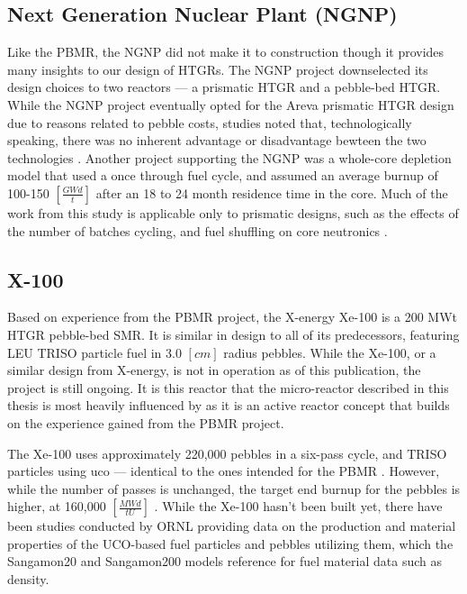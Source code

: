 \subsection{Next Generation Nuclear Plant (NGNP)}

Like the PBMR, the NGNP did not make it to construction though it provides many insights to our design of HTGRs.  The NGNP project downselected its design choices to two reactors --- a prismatic HTGR and a pebble-bed HTGR.  While the NGNP project eventually opted for the Areva prismatic HTGR design \cite{noauthor_areva_nodate} due to reasons related to pebble costs, studies noted that, technologically speaking, there was no inherent advantage or disadvantage bewteen the two technologies \cite{inl_basis_2011}.  Another project supporting the NGNP was a whole-core depletion model that used a once through fuel cycle, and assumed an average burnup of 100-150 $\left[\frac{GWd}{t}\right]$ after an 18 to 24 month residence time in the core.  Much of the work from this study is applicable only to prismatic designs, such as the effects of the number of batches cycling, and fuel shuffling on core neutronics \cite{tkkim_whole-core_nodate}.

\subsection{X-100}
\label{sec:xe-100}

Based on experience from the PBMR project, the X-energy Xe-100 is a 200 MWt HTGR pebble-bed SMR.  It is similar in design to all of its predecessors, featuring LEU TRISO particle fuel in 3.0 $\left[cm\right]$ radius pebbles.  While the Xe-100, or a similar design from X-energy, is not in operation as of this publication, the project is still ongoing.  It is this reactor that the micro-reactor described in this thesis is most heavily influenced by as it is an active reactor concept that builds on the experience gained from the PBMR project.

The Xe-100 uses approximately 220,000 pebbles in a six-pass cycle, and TRISO particles using \acrfull{uco} --- identical to the ones intended for the PBMR \cite{harlan_x-energy_2018}.  However, while the number of passes is unchanged, the target end burnup for the pebbles is higher, at 160,000 $\left[\frac{MWd}{tU}\right]$ \cite{agnihotri_intrinsically_2017}.  While the Xe-100 hasn't been built yet, there have been studies conducted by ORNL providing data on the production and material properties of the UCO-based fuel particles \cite{helmreich_year_2017} and pebbles utilizing them, which the Sangamon20 and Sangamon200 models reference for fuel material data such as density.

